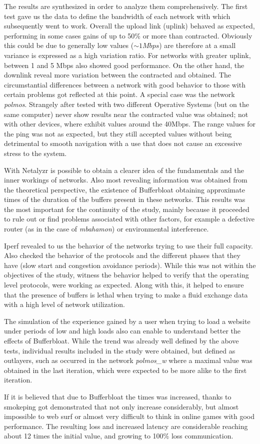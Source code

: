 The results are synthesized in order to analyze them comprehensively. 
The first test gave us the data to define the bandwidth of each
network with which subsequently went to work. Overall the upload link (uplink)
behaved as expected, performing in some cases gains of up to 50\% or more than
contracted. Obviously this could be due to generally low values ($\sim1Mbps$)
are therefore at a small variance is expressed as a high variation ratio. For
networks with greater uplink, between 1 and 5 Mbps also showed good
performance. On the other hand, the downlink reveal more variation between the
contracted and obtained. The circumstantial differences between a network with
good behavior to those with certain problems got reflected at this point. A
special case was the network \textit{polmos}. Strangely after tested with two
different Operative Systems (but on the same computer) never show results near
the contracted value was obtained; not with other devices, where exhibit
values around the 40Mbps. The range values for the ping was not as expected,
but they still accepted values without being detrimental to smooth navigation
with a use that does not cause an excessive stress to the system.

With Netalyzr is possible to obtain a clearer idea of the fundamentals and the
inner workings of networks. Also most revealing information was obtained from
the theoretical perspective, the existence of Bufferbloat obtaining
approximate times of the duration of the buffers present in these networks.
This results was the most important for the continuity of the study, mainly
because it proceeded to rule out or find problems associated with other
factors, for example a defective router (as in the case of \textit{mbahamon})
or environmental interference.

Iperf revealed to us the behavior of the networks trying to use their full
capacity. Also checked the behavior of the protocols and the different phases
that they have (slow start and congestion avoidance periods). While this was
not within the objectives of the study, witness the behavior helped to verify
that the operating level protocols, were working as expected. Along with this,
it helped to ensure that the presence of buffers is lethal when trying to make
a fluid exchange data with a high level of network utilization.

The simulation of the experience gained by a user when trying to load a
website under periods of low and high loads also can enable to understand
better the effects of Bufferbloat. While the trend was already well defined by
the above tests, individual results included in the study were obtained, but
defined as outlayers, such as occurred in the network \textit{polmos\_w} where
a maximal value was obtained in the last iteration, which were expected  to be
more alike to the first iteration.

If it is believed that due to Bufferbloat the times was increased, thanks to
smokeping got demonstrated that not only increase considerably, but almost
impossible to web surf or almost very difficult to think in online games with
good performance. The resulting loss and increased latency are considerable
reaching about 12 times the initial value, and growing to 100\% loss
communication.
